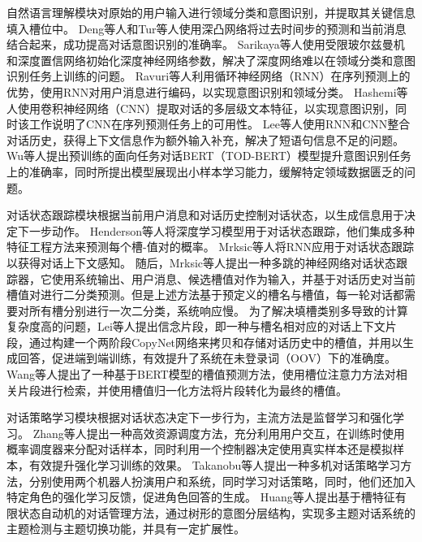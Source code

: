 自然语言理解模块对原始的用户输入进行领域分类和意图识别，并提取其关键信息填入槽位中。
Deng等人\cite{DBLP:conf/slt/DengTHH12}和Tur等人\cite{DBLP:conf/icassp/TurDHH12}使用深凸网络将过去时间步的预测和当前消息结合起来，成功提高对话意图识别的准确率。
Sarikaya等人\cite{DBLP:journals/taslp/SarikayaHD14}使用受限玻尔兹曼机和深度置信网络初始化深度神经网络参数，解决了深度网络难以在领域分类和意图识别任务上训练的问题。
Ravuri等人\cite{DBLP:conf/interspeech/RavuriS15}利用循环神经网络（RNN）在序列预测上的优势，使用RNN对用户消息进行编码，以实现意图识别和领域分类。
Hashemi等人\cite{hashemi2016query}使用卷积神经网络（CNN）提取对话的多层级文本特征，以实现意图识别，同时该工作说明了CNN在序列预测任务上的可用性。
Lee等人\cite{DBLP:conf/naacl/LeeD16}使用RNN和CNN整合对话历史，获得上下文信息作为额外输入补充，解决了短语句信息不足的问题。
Wu等人\cite{DBLP:journals/corr/abs-2004-06871}提出预训练的面向任务对话BERT（TOD-BERT）模型提升意图识别任务上的准确率，同时所提出模型展现出小样本学习能力，缓解特定领域数据匮乏的问题。

对话状态跟踪模块根据当前用户消息和对话历史控制对话状态，以生成信息用于决定下一步动作。
Henderson等人\cite{DBLP:conf/sigdial/HendersonTY13}将深度学习模型用于对话状态跟踪，他们集成多种特征工程方法来预测每个槽-值对的概率。
Mrksic等人\cite{DBLP:conf/acl/MrksicSTGSVWY15}将RNN应用于对话状态跟踪以获得对话上下文感知。
随后，Mrksic等人\cite{DBLP:conf/acl/MrksicSWTY17}提出一种多跳的神经网络对话状态跟踪器，它使用系统输出、用户消息、候选槽值对作为输入，并基于对话历史对当前槽值对进行二分类预测。但是上述方法基于预定义的槽名与槽值，每一轮对话都需要对所有槽分别进行一次二分类，系统响应慢。
为了解决填槽类别多导致的计算复杂度高的问题，Lei等人\cite{DBLP:conf/acl/KanHLJRY18}提出信念片段，即一种与槽名相对应的对话上下文片段，通过构建一个两阶段CopyNet网络来拷贝和存储对话历史中的槽值，并用以生成回答，促进端到端训练，有效提升了系统在未登录词（OOV）下的准确度。
Wang等人\cite{DBLP:conf/emnlp/WangGZ20}提出了一种基于BERT模型的槽值预测方法，使用槽位注意力方法对相关片段进行检索，并使用槽值归一化方法将片段转化为最终的槽值。

对话策略学习模块根据对话状态决定下一步行为，主流方法是监督学习和强化学习。
Zhang等人\cite{DBLP:conf/acl/ZhangLGC19}提出一种高效资源调度方法，充分利用用户交互，在训练时使用概率调度器来分配对话样本，同时利用一个控制器决定使用真实样本还是模拟样本，有效提升强化学习训练的效果。
Takanobu等人\cite{DBLP:conf/acl/TakanobuLH20}提出一种多机对话策略学习方法，分别使用两个机器人扮演用户和系统，同时学习对话策略，同时，他们还加入特定角色的强化学习反馈，促进角色回答的生成。
Huang等人\cite{JSJX200408010}提出基于槽特征有限状态自动机的对话管理方法，通过树形的意图分层结构，实现多主题对话系统的主题检测与主题切换功能，并具有一定扩展性。

